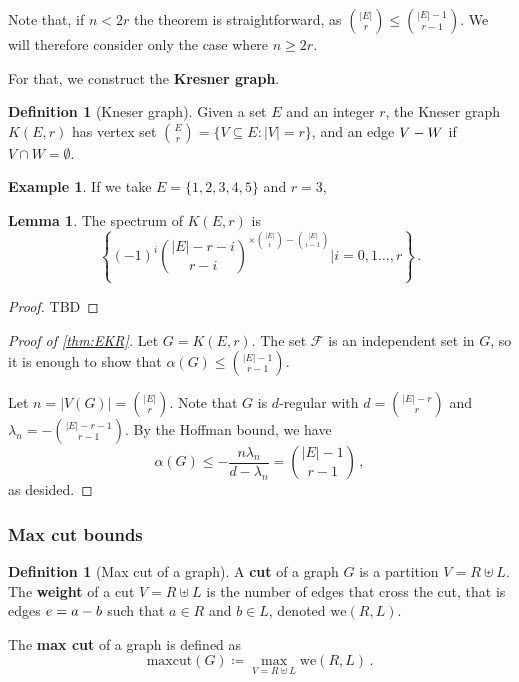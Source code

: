 \documentclass[12pt]{amsart}
\theoremstyle{definition}
\newtheorem{lm}[thm]{Lemma}
\newtheorem{defin}[thm]{Definition}
\newtheorem{smpl}[thm]{Example}
\newcommand{\R}{\mathbb{R}}
\newcommand{\K}{\mathbb{K}}
\newcommand{\FF}{\mathcal F}
\newcommand{\maxcut}{\mathrm{maxcut}}
\newcommand{\we}{\mathrm{we}}
\begin{document}
Note that, if $n < 2r$ the theorem is straightforward, as $\binom{|E|}{r} \leq \binom{|E|-1}{r-1}$.
We will therefore consider only the case where $n \geq 2r$.

For that, we construct the \textbf{Kresner graph}.

\begin{defin}[Kneser graph]
Given a set $E$ and an integer $r$, the Kneser graph $K(E, r)$ has vertex set $\binom{E}{r} = \{ V \subseteq E : |V| = r\}$, and an edge $V \-- W$ if $V \cap W = \emptyset$.
\end{defin}

\begin{smpl}
If we take $E = \{1, 2, 3, 4, 5\}$ and $r = 3$, 
\end{smpl}

\begin{lm}
The spectrum of $K(E, r)$ is 
$$ \left\{(-1)^i\binom{|E| -r - i}{r - i}^{\times \binom{|E|}{i} - \binom{|E|}{i-1}} \Big| i = 0, 1 \ldots , r \right\} \, . $$
\end{lm}

\begin{proof}
%
%
TBD
\end{proof}

\begin{proof}[Proof of \cref{thm:EKR}]
Let $G = K(E, r)$.
The set $\FF$ is an independent set in $G$, so it is enough to show that $\alpha(G) \leq \binom{|E|-1}{r-1}$.

Let $n = |V(G)| = \binom{|E|}{r}$.
Note that  $G$ is $d$-regular with $d = \binom{|E|-r}{r}$ and $\lambda_n = -\binom{|E| -r -1 }{r - 1}$.
By the Hoffman bound, we have
$$ \alpha(G) \leq -\frac{n\lambda_n}{d - \lambda_n} = \binom{|E|-1}{r-1} \, ,$$
as desided.
\end{proof}


\subsubsection*{Max cut bounds}



\begin{defin}[Max cut of a graph]
A \textbf{cut} of a graph $G$ is a partition $V = R \uplus L$.
The \textbf{weight} of a cut $V = R \uplus L$ is the number of edges that cross the cut, that is edges $e = a \-- b$ such that $a \in R$ and $b \in L$, denoted $\we(R, L)$.

The \textbf{max cut} of a graph is defined as
$$ \maxcut (G) \coloneqq \max_{V = R \uplus L} \we(R, L) \, . $$
\end{defin}
\end{document}
